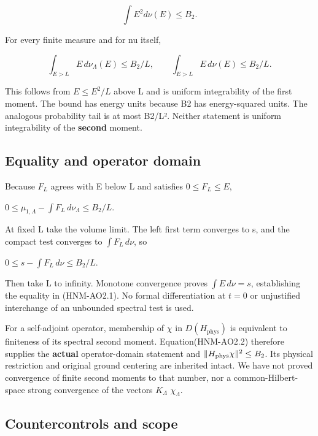 \begin{equation}
\int E^2d\nu(E)\le B_2.\tag{HNM-AO2.2}
\label{r29:ao2:eq2}
\end{equation}

For every finite measure and for nu itself,

\begin{equation}
\int_{E>L}E\,d\nu_\Lambda(E)\le B_2/L,\qquad
\int_{E>L}E\,d\nu(E)\le B_2/L.\tag{HNM-AO2.3}
\label{r29:ao2:eq3}
\end{equation}

This follows from \(E\le E^{2}/L\) above L and is uniform integrability of the first moment. The bound has energy units because B2 has energy-squared units. The analogous probability tail is at most B2/L². Neither statement is uniform integrability of the \textbf{second} moment.

\hypertarget{r29-ao2-equality-and-operator-domain}{%
\subsection{Equality and operator domain}\label{r29:ao2:r29-ao2-equality-and-operator-domain}}

Because \(F_L\) agrees with E below L and satisfies \(0\le F_L\le E\),

\(0\le\mu_{1,\Lambda}-\int F_L\,d\nu_\Lambda\le B_2/L\).

At fixed L take the volume limit. The left first term converges to s, and the compact test converges to \(\int F_L\,d\nu\), so

\(0\le s-\int F_L\,d\nu\le B_2/L\).

Then take L to infinity. Monotone convergence proves \(\int E\,d\nu=s\), establishing the equality in (HNM-AO2.1). No formal differentiation at \(t=0\) or unjustified interchange of an unbounded spectral test is used.

For a self-adjoint operator, membership of \(\chi\) in \(D(H_{\mathrm{phys}})\) is equivalent to finiteness of its spectral second moment. Equation(HNM-AO2.2) therefore supplies the \textbf{actual} operator-domain statement and \(\|H_{\rm phys}\chi\|^2\le B_2\). Its physical restriction and original ground centering are inherited intact. We have not proved convergence of finite second moments to that number, nor a common-Hilbert-space strong convergence of the vectors \(K_\Lambda\) \(\chi_\Lambda\).

\hypertarget{r29-ao2-countercontrols-and-scope}{%
\subsection{Countercontrols and scope}\label{r29:ao2:r29-ao2-countercontrols-and-scope}}

